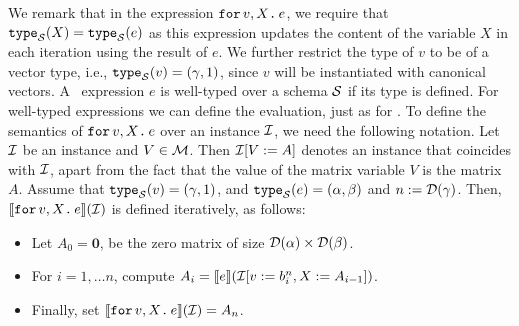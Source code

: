 %
We remark that in the expression $\texttt{for}\, v,X \texttt{.}\, e$, we require that $\texttt{type}_{\mathcal{S}}(X) = \texttt{type}_{\mathcal{S}}(e)$ as this expression updates the content of the variable $X$ in each iteration using the result of $e$. We further restrict the type of 
$v$ to be of a vector type, i.e., $\texttt{type}_{\mathcal{S}}(v)=(\gamma,1)$, since $v$ will be instantiated with canonical vectors.
%
A \langfor\ expression $e$ is well-typed over a schema $\mathcal{S}$ if its type is defined. For well-typed expressions we can define the evaluation, just as for \lang. To define the semantics of $\texttt{for}\, v,X \texttt{.}\, e$ over an instance $\mathcal{I}$, we need the following notation. Let $\mathcal{I}$ be an instance and $V\in \mathcal{M}$. Then $\mathcal{I}[V := A]$ denotes an instance that coincides with $\mathcal{I}$, apart from the fact that the value of the matrix variable $V$ is the matrix $A$. Assume that
$\texttt{type}_{\mathcal{S}}(v)= (\gamma,1)$, and $\texttt{type}_{\mathcal{S}}(e) = (\alpha,\beta)$ and $n := \mathcal{D}(\gamma)$. Then, $\llbracket \texttt{for}\, v,X \texttt{.}\, e \rrbracket(\mathcal{I})$ is defined iteratively, as follows:
\begin{itemize}
\item Let $A_0 = \mathbf{0}$, be the zero matrix of size $\mathcal{D}(\alpha)\times \mathcal{D}(\beta)$.
\item For $i=1,\ldots n$, compute $A_i = \llbracket e \rrbracket(\mathcal{I}[v := b^{n}_i, X:= A_{i-1}])$.
\item Finally, set $\llbracket \texttt{for}\, v,X \texttt{.}\, e \rrbracket(\mathcal{I}) = A_{n}$.
\end{itemize}

